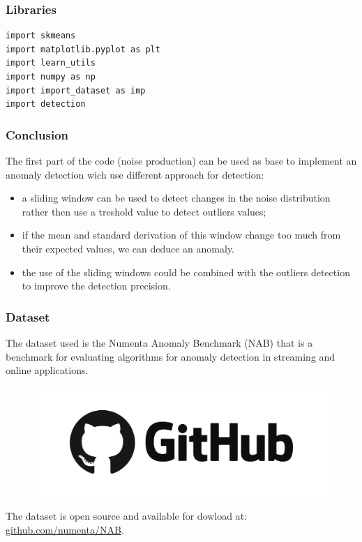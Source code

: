 \documentclass[xcolor ={table,usenames,dvipsnames}]{beamer}
\theoremstyle{definition}
\begin{document}
	\begin{frame}[fragile]
		\frametitle{Libraries}
		
		\begin{lstlisting}
import skmeans
import matplotlib.pyplot as plt
import learn_utils
import numpy as np
import import_dataset as imp
import detection
		\end{lstlisting}
	\end{frame}

	\begin{frame}
		\frametitle{Conclusion}
		The first part of the code (noise production) can be used as base to implement an anomaly detection wich use different approach for detection:
		\begin{itemize}
			\item a sliding window can be used to detect changes in the noise distribution rather then use a treshold value to detect outliers values;
			\item if the mean and standard derivation of this window change too much from their expected values, we can deduce an anomaly.
			\item the use of the sliding windows could be combined with the outliers detection to improve the detection precision.
		\end{itemize}
	\end{frame}

	\begin{frame}[fragile]
		\frametitle{Dataset}
		The dataset used is the Numenta Anomaly Benchmark (NAB) that is a benchmark for evaluating algorithms for anomaly detection in streaming and online applications.
		
		\begin{figure}[h!]
			\centering
			\includegraphics[scale=0.08]{img/github.png}
		\end{figure}
	
		The dataset is open source and available for dowload at:\\
		\href{github.com/numenta/NAB}{github.com/numenta/NAB}.
	\end{frame}
	
\end{document}
